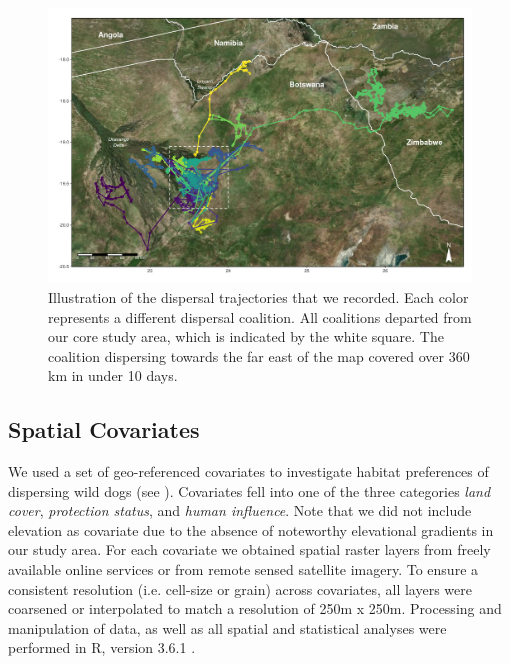 \documentclass[abstract=on,10pt,a4paper,bibliography=totocnumbered]{scrartcl}
\begin{document}
\begin{figure}[h]
  \begin{center}
    \includegraphics[width = \textwidth]{99_Trajectories.pdf}
    \caption{Illustration of the dispersal trajectories that we recorded. Each
    color represents a different dispersal coalition. All coalitions departed
    from our core study area, which is indicated by the white square. The
    coalition dispersing towards the far east of the map covered over 360 km in
    under 10 days.}
    \label{Trajectories}
  \end{center}
\end{figure}

\subsection{Spatial Covariates}
We used a set of geo-referenced covariates to investigate habitat preferences of
dispersing wild dogs (see ). Covariates fell into one of the
three categories \textit{land cover}, \textit{protection status}, and
\textit{human influence}. Note that we did not include elevation as covariate
due to the absence of noteworthy elevational gradients in our study area. For
each covariate we obtained spatial raster layers from freely available online
services or from remote sensed satellite imagery. To ensure a consistent
resolution (i.e. cell-size or grain) across covariates, all layers were
coarsened or interpolated to match a resolution of 250m x 250m. Processing and
manipulation of data, as well as all spatial and statistical analyses were
performed in R, version 3.6.1 \citep{R.2019}.
\end{document}
